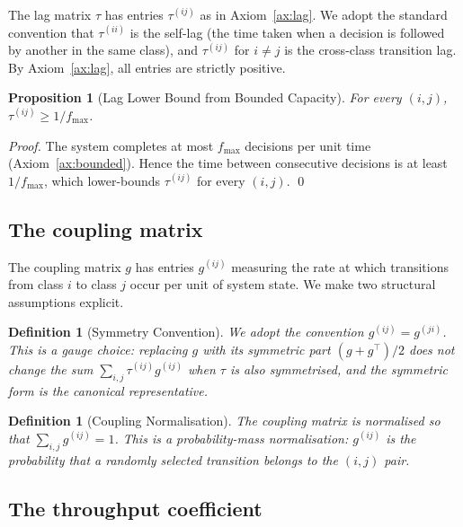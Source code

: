 \documentclass[twocolumn,11pt,a4paper]{article}
\newtheorem{proposition}[theorem]{Proposition}
\newtheorem{definition}[theorem]{Definition}
\newcommand{\lag}{\tau}
\newcommand{\cpl}{g}
\begin{document}
The lag matrix $\lag$ has entries $\lag^{(ij)}$ as in Axiom~\ref{ax:lag}. We adopt the standard convention that $\lag^{(ii)}$ is the self-lag (the time taken when a decision is followed by another in the same class), and $\lag^{(ij)}$ for $i \neq j$ is the cross-class transition lag. By Axiom~\ref{ax:lag}, all entries are strictly positive.

\begin{proposition}[Lag Lower Bound from Bounded Capacity]
\label{prop:lag-lower}
For every $(i, j)$, $\lag^{(ij)} \geq 1/f_{\max}$.
\end{proposition}

\begin{proof}
The system completes at most $f_{\max}$ decisions per unit time (Axiom~\ref{ax:bounded}). Hence the time between consecutive decisions is at least $1/f_{\max}$, which lower-bounds $\lag^{(ij)}$ for every $(i, j)$. \qed
\end{proof}

\subsection{The coupling matrix}

The coupling matrix $\cpl$ has entries $\cpl^{(ij)}$ measuring the rate at which transitions from class $i$ to class $j$ occur per unit of system state. We make two structural assumptions explicit.

\begin{definition}[Symmetry Convention]
\label{def:symmetry}
We adopt the convention $\cpl^{(ij)} = \cpl^{(ji)}$. This is a gauge choice: replacing $\cpl$ with its symmetric part $(\cpl + \cpl^\top)/2$ does not change the sum $\sum_{i,j} \lag^{(ij)} \cpl^{(ij)}$ when $\lag$ is also symmetrised, and the symmetric form is the canonical representative.
\end{definition}

\begin{definition}[Coupling Normalisation]
\label{def:coupling-norm}
The coupling matrix is normalised so that $\sum_{i,j} \cpl^{(ij)} = 1$. This is a probability-mass normalisation: $\cpl^{(ij)}$ is the probability that a randomly selected transition belongs to the $(i, j)$ pair.
\end{definition}

\subsection{The throughput coefficient}
\end{document}
